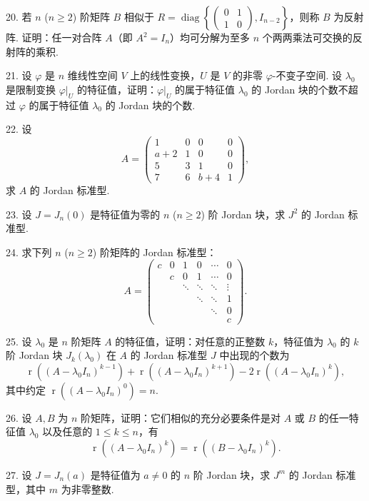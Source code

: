 \documentclass[UTF8, 12pt, fontset=fandol, oneside]{ctexart}
\begin{document}
20. 若 $n$ ($n\geq 2$) 阶矩阵 $B$ 相似于 $R=\operatorname{diag}\left\{\left(\begin{array}{cc}0&1\\1&0\end{array}\right),I_{n-2}\right\}$，则称 $B$ 为反射阵. 证明：任一对合阵 $A$（即 $A^2=I_n$）均可分解为至多 $n$ 个两两乘法可交换的反射阵的乘积.

21. 设 $\varphi$ 是 $n$ 维线性空间 $V$ 上的线性变换，$U$ 是 $V$ 的非零 $\varphi$-不变子空间. 设 $\lambda_0$ 是限制变换 $\varphi|_U$ 的特征值，证明：$\varphi|_U$ 的属于特征值 $\lambda_0$ 的 Jordan 块的个数不超过 $\varphi$ 的属于特征值 $\lambda_0$ 的 Jordan 块的个数.

22. 设
\[
A=\left(\begin{array}{cccc}
1 & 0 & 0 & 0\\
a+2 & 1 & 0 & 0\\
5 & 3 & 1 & 0\\
7 & 6 & b+4 & 1
\end{array}\right),
\]
求 $A$ 的 Jordan 标准型.

23. 设 $J=J_n(0)$ 是特征值为零的 $n$ ($n\geq 2$) 阶 Jordan 块，求 $J^2$ 的 Jordan 标准型.

24. 求下列 $n$ ($n\geq 2$) 阶矩阵的 Jordan 标准型：
\[
A=\left(\begin{array}{cccccc}
c & 0 & 1 & 0 & \cdots & 0\\
& c & 0 & 1 & \cdots & 0\\
& & \ddots & \ddots & \ddots & \vdots\\
& & & \ddots & \ddots & 1\\
& & & & \ddots & 0\\
& & & & & c
\end{array}\right).
\]

25. 设 $\lambda_0$ 是 $n$ 阶矩阵 $A$ 的特征值，证明：对任意的正整数 $k$，特征值为 $\lambda_0$ 的 $k$ 阶 Jordan 块 $J_k(\lambda_0)$ 在 $A$ 的 Jordan 标准型 $J$ 中出现的个数为
\[
\operatorname{r}((A-\lambda_0I_n)^{k-1})+\operatorname{r}((A-\lambda_0I_n)^{k+1})-2\operatorname{r}((A-\lambda_0I_n)^k),
\]
其中约定 $\operatorname{r}((A-\lambda_0I_n)^0)=n$.

26. 设 $A,B$ 为 $n$ 阶矩阵，证明：它们相似的充分必要条件是对 $A$ 或 $B$ 的任一特征值 $\lambda_0$ 以及任意的 $1\leq k\leq n$，有
\[
\operatorname{r}((A-\lambda_0I_n)^k)=\operatorname{r}((B-\lambda_0I_n)^k).
\]

27. 设 $J=J_n(a)$ 是特征值为 $a\ne 0$ 的 $n$ 阶 Jordan 块，求 $J^m$ 的 Jordan 标准型，其中 $m$ 为非零整数.
\end{document}
